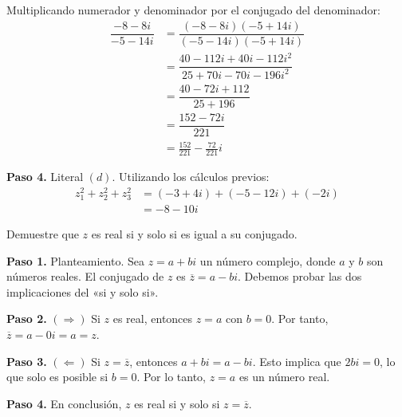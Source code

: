 \begin{example}
\begin{myproof}
Multiplicando numerador y denominador por el conjugado del denominador:
\begin{align*}
\dfrac{-8-8i}{-5-14i} &= \dfrac{(-8-8i)(-5+14i)}{(-5-14i)(-5+14i)}\\
&= \dfrac{40-112i+40i-112i^2}{25+70i-70i-196i^2}\\
&= \dfrac{40-72i+112}{25+196}\\
&= \dfrac{152-72i}{221}\\
&= \boxed{\frac{152}{221}-\frac{72}{221}i}
\end{align*}

\textbf{Paso 4.} Literal $(d)$. Utilizando los cálculos previos:
\begin{align*}
z_1^2 + z_2^2 +z_3^2 &= (-3+4i) + (-5-12i) + (-2i)\\
&= \boxed{-8-10i}
\end{align*}
\end{myproof}
\end{example}

\begin{example} Demuestre que $z$ es real si y solo si es igual a su conjugado.

\begin{myproof}
\textbf{Paso 1.} Planteamiento. Sea $z=a+bi$ un número complejo, donde $a$ y $b$ son números reales. El conjugado de $z$ es $\overline{z}=a-bi$. Debemos probar las dos implicaciones del «si y solo si».

\textbf{Paso 2.} $(\Rightarrow)$ Si $z$ es real, entonces $z=a$ con $b=0$. Por tanto, $\overline{z}=a-0i=a=z$.

\textbf{Paso 3.} $(\Leftarrow)$ Si $z=\overline{z}$, entonces $a+bi=a-bi$. Esto implica que $2bi=0$, lo que solo es posible si $b=0$. Por lo tanto, $z=a$ es un número real.

\textbf{Paso 4.} En conclusión, $z$ es real si y solo si $z=\overline{z}$.
\end{myproof}
\end{example}


